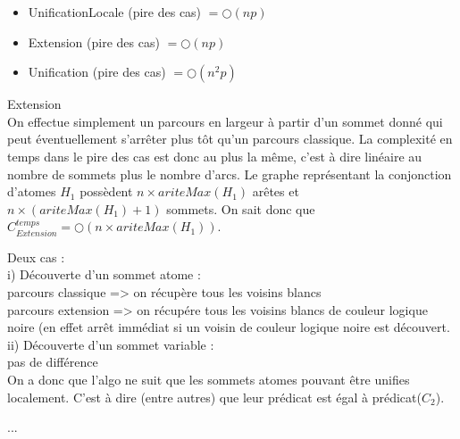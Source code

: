 \begin{itemize}
	\item UnificationLocale (pire des cas) $= \bigcirc(np)$
	\item Extension (pire des cas) $= \bigcirc(np)$
	\item Unification (pire des cas) $= \bigcirc(n^{2}p)$
\end{itemize}

Extension\\
On effectue simplement un parcours en largeur \`a partir d'un sommet donn\'e qui peut \'eventuellement s'arr\^eter plus
t\^ot qu'un parcours classique. La complexit\'e en temps dans le pire des cas est donc au plus la m\^eme, c'est \`a dire lin\'eaire
au nombre de sommets plus le nombre d'arcs. Le graphe repr\'esentant la conjonction d'atomes $H_{1}$ poss\`edent $n \times ariteMax(H_{1})$ ar\^etes
et $n \times (ariteMax(H_{1}) + 1)$ sommets.
On sait donc que $C_{Extension}^{temps} = \bigcirc(n \times ariteMax(H_1))$.


Deux cas :\\
	i) D\'ecouverte d'un sommet atome : \\
		parcours classique => on r\'ecup\`ere tous les voisins blancs \\
		parcours extension => on r\'ecup\'ere tous les voisins blancs de couleur logique noire (en effet arr\^et imm\'ediat si un voisin de couleur logique noire est d\'ecouvert.\\
	ii) D\'ecouverte d'un sommet variable :\\
		pas de diff\'erence\\
On a donc que l'algo ne suit que les sommets atomes pouvant \^etre unifies localement. C'est \`a dire (entre autres) que leur pr\'edicat est \'egal \`a pr\'edicat($C_{2}$).



...




